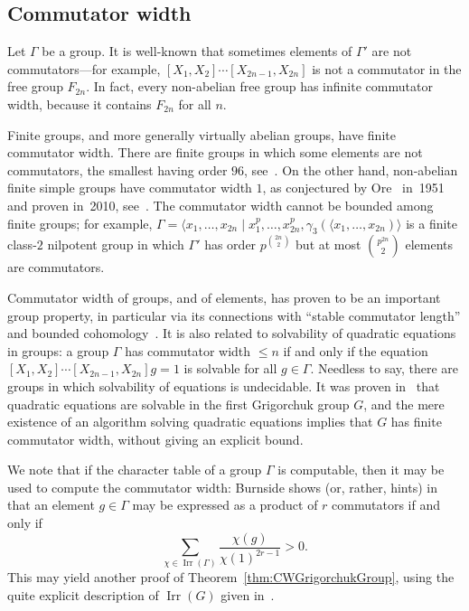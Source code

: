 \documentclass[a4paper,11pt]{amsart}
\begin{document}
\subsection{Commutator width}
Let $\Gamma$ be a group. It is well-known that sometimes elements of
$\Gamma'$ are not commutators---for example,
$[X_1,X_2]\cdots[X_{2n-1},X_{2n}]$ is not a commutator in the free
group $F_{2n}$. In fact, every non-abelian free group has infinite
commutator width, because it contains $F_{2n}$ for all $n$.

Finite groups, and more generally virtually abelian groups, have
finite commutator width.  There are finite groups in which some
elements are not commutators, the smallest having order $96$,
see~\cite{Guralnick:Group96}. On the other hand, non-abelian finite
simple groups have commutator width $1$, as conjectured by
Ore~\cite{Ore:Commutators} in~1951 and proven in~2010,
see~\cite{Liebeck:OreConjecture}. The commutator width cannot be
bounded among finite groups; for example,
$\Gamma=\langle x_1,\dots,x_{2n}\mid
x_1^p,\dots,x_{2n}^p,\gamma_3(\langle x_1,\dots,x_{2n})\rangle$ is a
finite class-$2$ nilpotent group in which $\Gamma'$ has order
$p^{\binom{2n}2}$ but at most $\binom{p^{2n}}2$ elements are
commutators.

Commutator width of groups, and of elements, has proven to be an
important group property, in particular via its connections with
``stable commutator length'' and bounded
cohomology~\cite{Calegari:SCL}. It is also related to solvability of
quadratic equations in groups: a group $\Gamma$ has commutator width
$\le n$ if and only if the equation
$[X_1,X_2]\cdots[X_{2n-1},X_{2n}]g=1$ is solvable for all
$g\in\Gamma$. Needless to say, there are groups in which solvability
of equations is undecidable. It was proven
in~\cite{Lysenok:QudraticEquationsInGrig} that quadratic equations are
solvable in the first Grigorchuk group $G$, and the mere existence of
an algorithm solving quadratic equations implies that $G$ has finite
commutator width, without giving an explicit bound.

We note that if the character table of a group $\Gamma$ is computable,
then it may be used to compute the commutator width: Burnside shows
(or, rather, hints) in~\cite[\S238, Ex. 7]{Burnside:Groups} that an
element $g\in\Gamma$ may be expressed as a product of $r$ commutators
if and only if
\[\sum_{\chi\in\operatorname{Irr}(\Gamma)}\frac{\chi(g)}{\chi(1)^{2r-1}}>0.\]
This may yield another proof of Theorem~\ref{thm:CWGrigorchukGroup},
using the quite explicit description of $\operatorname{Irr}(G)$ given
in~\cite{Bartholdi:RepresentationZetaFunctions}.
\end{document}
